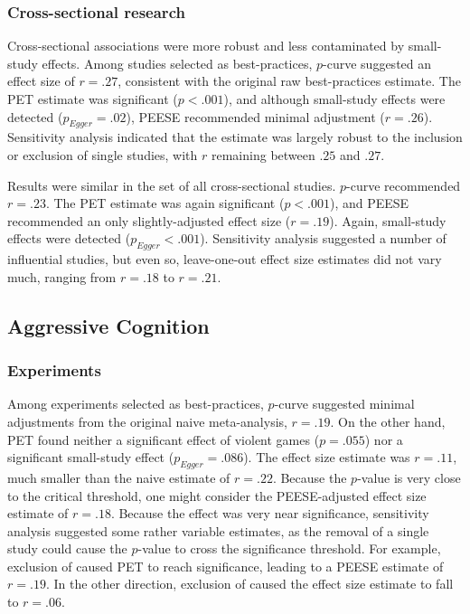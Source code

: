 \documentclass[man]{apa6}
\begin{document}
\subsubsection{Cross-sectional research}
Cross-sectional associations were more robust and less contaminated by small-study effects. Among studies selected as best-practices, $p$-curve suggested an effect size of $r = .27$, consistent with the original raw best-practices estimate. The PET estimate was significant ($p < .001$), and although small-study effects were detected ($p_{Egger} = .02$), PEESE recommended minimal adjustment ($r = .26$). Sensitivity analysis indicated that the estimate was largely robust to the inclusion or exclusion of single studies, with $r$ remaining between $.25$ and $.27$. 

Results were similar in the set of all cross-sectional studies. $p$-curve recommended $r = .23$. The PET estimate was again significant ($p < .001$), and PEESE recommended an only slightly-adjusted effect size ($r = .19$). Again, small-study effects were detected ($p_{Egger} < .001$). Sensitivity analysis suggested a number of influential studies, but even so, leave-one-out effect size estimates did not vary much, ranging from $r = .18$ to $r = .21$.

\subsection{Aggressive Cognition}
\subsubsection{Experiments}
Among experiments selected as best-practices, $p$-curve suggested minimal adjustments from the original naive meta-analysis, $r = .19$. On the other hand, PET found neither a significant effect of violent games ($p = .055$) nor a significant small-study effect ($p_{Egger} = .086$). The effect size estimate was $r = .11$, much smaller than the naive estimate of $r = .22$. Because the $p$-value is very close to the critical threshold, one might consider the PEESE-adjusted effect size estimate of $r = .18$. Because the effect was very near significance, sensitivity analysis suggested some rather variable estimates, as the removal of a single study could cause the $p$-value to cross the significance threshold. For example, exclusion of \citet{Bushman:Anderson:2009} caused PET to reach significance, leading to a PEESE estimate of $r = .19$. In the other direction, exclusion of \citet{Anderson:Dill:2000} caused the effect size estimate to fall to $r = .06$.
\end{document}
